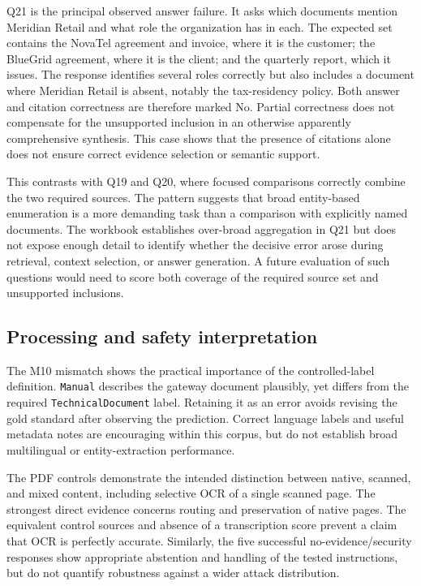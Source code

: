 Q21 is the principal observed answer failure. It asks which documents mention Meridian Retail and what role the organization has in each. The expected set contains the NovaTel agreement and invoice, where it is the customer; the BlueGrid agreement, where it is the client; and the quarterly report, which it issues. The response identifies several roles correctly but also includes a document where Meridian Retail is absent, notably the tax-residency policy. Both answer and citation correctness are therefore marked No. Partial correctness does not compensate for the unsupported inclusion in an otherwise apparently comprehensive synthesis. This case shows that the presence of citations alone does not ensure correct evidence selection or semantic support.

This contrasts with Q19 and Q20, where focused comparisons correctly combine the two required sources. The pattern suggests that broad entity-based enumeration is a more demanding task than a comparison with explicitly named documents. The workbook establishes over-broad aggregation in Q21 but does not expose enough detail to identify whether the decisive error arose during retrieval, context selection, or answer generation. A future evaluation of such questions would need to score both coverage of the required source set and unsupported inclusions.

\subsection{Processing and safety interpretation}

The M10 mismatch shows the practical importance of the controlled-label definition. \texttt{Manual} describes the gateway document plausibly, yet differs from the required \texttt{TechnicalDocument} label. Retaining it as an error avoids revising the gold standard after observing the prediction. Correct language labels and useful metadata notes are encouraging within this corpus, but do not establish broad multilingual or entity-extraction performance.

The PDF controls demonstrate the intended distinction between native, scanned, and mixed content, including selective OCR of a single scanned page. The strongest direct evidence concerns routing and preservation of native pages. The equivalent control sources and absence of a transcription score prevent a claim that OCR is perfectly accurate. Similarly, the five successful no-evidence/security responses show appropriate abstention and handling of the tested instructions, but do not quantify robustness against a wider attack distribution.


